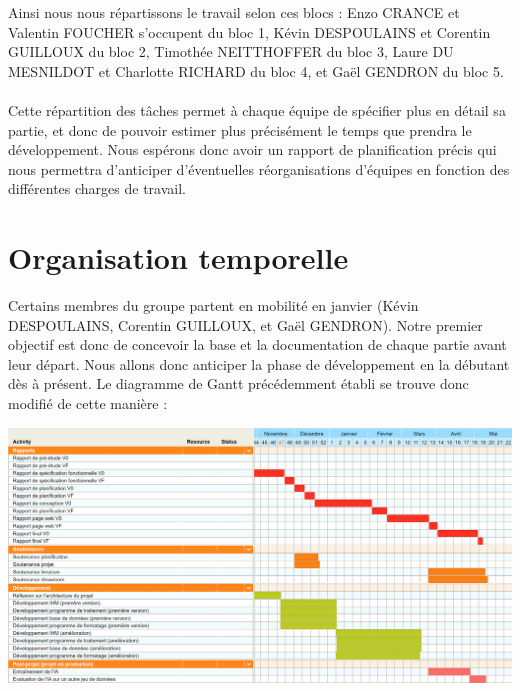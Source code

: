 Ainsi nous nous répartissons le travail selon ces blocs : Enzo CRANCE et
Valentin FOUCHER s’occupent du bloc 1, Kévin DESPOULAINS et Corentin GUILLOUX
du bloc 2, Timothée NEITTHOFFER du bloc 3, Laure DU MESNILDOT et Charlotte
RICHARD du bloc 4, et Gaël GENDRON du bloc 5. 

\paragraph{}
Cette répartition des tâches permet à chaque équipe de spécifier plus en détail
sa partie, et donc de pouvoir estimer plus précisément le temps que prendra le
développement. Nous espérons donc avoir un rapport de planification précis qui
nous permettra d’anticiper d’éventuelles réorganisations d’équipes en fonction
des différentes charges de travail.

\section{Organisation temporelle}

Certains membres du groupe partent en mobilité en janvier (Kévin DESPOULAINS,
Corentin GUILLOUX, et Gaël GENDRON). Notre premier objectif est donc de
concevoir la base et la documentation de chaque partie avant leur départ.
Nous allons donc anticiper la phase de développement en la débutant dès à
présent. Le diagramme de Gantt précédemment établi se trouve donc modifié de
cette manière :

\newpage

\begin{mdframed}[frametitle={Figure 17 : Estimation de la planification des tâches}, innerbottommargin=10]
\begin{center}
\includegraphics[scale=0.5]{gantt.png}
\end{center}
\end{mdframed}

